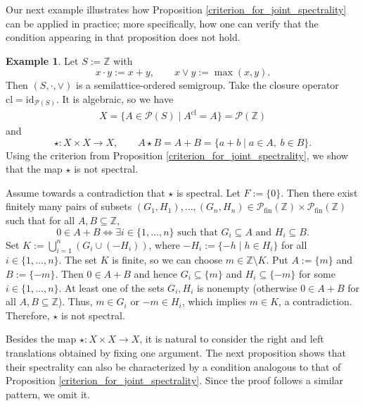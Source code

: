 \documentclass[10pt, reqno]{amsart}
\theoremstyle{plain}
\theoremstyle{definition}
\newtheorem{example}[theorem]{Example}
\begin{document}
Our next example illustrates how Proposition \ref{criterion_for_joint_spectrality} can be applied in practice; more specifically, how one can verify that the condition appearing in that proposition does not hold.  
\begin{example}
Let $S := \mathbb{Z}$ with $$x \cdot y := x + y, \qquad x \lor y := \max(x, y).$$ Then $(S, \cdot, \lor)$ is a semilattice-ordered semigroup. Take the closure operator $\mathrm{cl} = \mathrm{id}_{\mathcal{P}(S)}$. It is algebraic, so we have  
\begin{equation*}\begin{aligned}
    X = \{A \in \mathcal{P}(S) \mid A^\mathrm{cl} = A\} = \mathcal{P}(\mathbb{Z})     
\end{aligned}\end{equation*}
and 
\begin{equation*}
    \star : X \times X \rightarrow X, \qquad A \star B = A + B = \{a + b \mid a \in A, \hspace{3pt} b \in B\}.
\end{equation*}
Using the criterion from Proposition \ref{criterion_for_joint_spectrality}, we show that the map $\star$ is not spectral. 

Assume towards a contradiction that $\star$ is spectral. Let $F := \{0\}$. Then there exist finitely many pairs of subsets $(G_1, H_1), \ldots, (G_n, H_n) \in \mathcal{P}_\mathrm{fin}(\mathbb{Z}) \times \mathcal{P}_\mathrm{fin}(\mathbb{Z})$ such that for all $A, B \subseteq \mathbb{Z}$, $$0 \in A + B \iff \exists i\in\{1,\ldots,n\} \text{ such that } G_i \subseteq A \text{ and } H_i \subseteq B.$$
Set $K := \bigcup_{i = 1}^n (G_i \cup (-H_i))$, where $-H_i := \{-h \mid h \in H_i\}$ for all $i \in \{1, \ldots, n\}$. The set $K$ is finite, so we can choose $m \in \mathbb{Z}\setminus K$. Put $A := \{m\}$ and $B := \{-m\}$. Then $0 \in A + B$ and hence $G_i \subseteq \{m\}$ and $H_i \subseteq \{-m\}$ for some $i\in\{1, \ldots, n\}$. At least one of the sets $G_i, H_i$ is nonempty (otherwise $0 \in A + B$ for all $A, B\subseteq\mathbb{Z}$). Thus, $m\in G_i$ or $-m\in H_i$, which implies $m \in K$, a contradiction. Therefore, $\star$ is not spectral. 
\end{example}

Besides the map $\star : X \times X \rightarrow X$, it is natural to consider the right and left translations obtained by fixing one argument. The next proposition shows that their spectrality can also be characterized by a condition analogous to that of Proposition \ref{criterion_for_joint_spectrality}. Since the proof follows a similar pattern, we omit it. 
\end{document}
